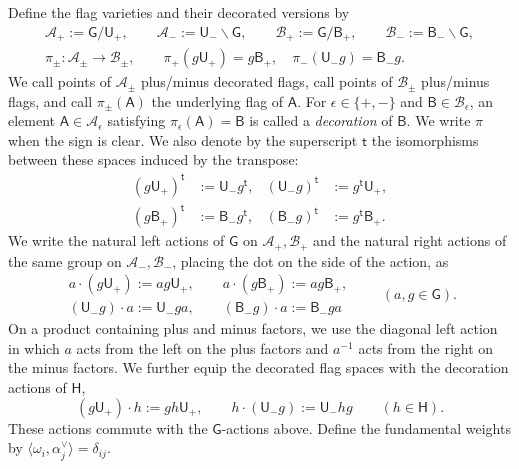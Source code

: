 \documentclass[10pt,a4paper]{article}
\theoremstyle{definition}
\theoremstyle{remark}
\newcommand{\Aplus}{\mathcal A_+}
\newcommand{\Aminus}{\mathcal A_-}
\newcommand{\Bplus}{\mathcal B_+}
\newcommand{\Bminus}{\mathcal B_-}
\newcommand{\flagA}{\mathsf{A}}
\newcommand{\flagB}{\mathsf{B}}
\newcommand{\groupG}{\mathsf{G}}
\newcommand{\borelB}{\mathsf{B}}
\newcommand{\unipotentU}{\mathsf{U}}
\newcommand{\torusH}{\mathsf{H}}
\begin{document}
Define the flag varieties and their decorated versions by
\begin{gather*}
 \Aplus:=\groupG/\unipotentU_+,\qquad
 \Aminus:=\unipotentU_-\backslash\groupG,\qquad
 \Bplus:=\groupG/\borelB_+,\qquad
 \Bminus:=\borelB_-\backslash\groupG,
\\
 \pi_\pm:\mathcal A_\pm\longrightarrow\mathcal B_\pm,\qquad
 \pi_+(g\unipotentU_+)=g\borelB_+,\quad
 \pi_-(\unipotentU_-g)=\borelB_-g.
\end{gather*}
We call points of \(\mathcal A_\pm\) plus/minus decorated flags, call points
of \(\mathcal B_\pm\) plus/minus flags, and call \(\pi_\pm(\flagA)\) the
underlying flag of \(\flagA\).  For \(\epsilon\in\{+,-\}\) and
\(\flagB\in\mathcal B_\epsilon\), an element
\(\flagA\in\mathcal A_\epsilon\) satisfying \(\pi_\epsilon(\flagA)=\flagB\)
is called a \emph{decoration} of \(\flagB\).  We write \(\pi\) when the sign is
clear.  We also denote by the superscript \(\mathsf t\) the isomorphisms
between these spaces induced by the transpose:
\[
 \begin{aligned}
  (g\unipotentU_+)^{\mathsf t}&:=\unipotentU_-g^{\mathsf t},&
  (\unipotentU_-g)^{\mathsf t}&:=g^{\mathsf t}\unipotentU_+,\\
  (g\borelB_+)^{\mathsf t}&:=\borelB_-g^{\mathsf t},&
  (\borelB_-g)^{\mathsf t}&:=g^{\mathsf t}\borelB_+.
 \end{aligned}
\]
We write the natural left actions of \(\groupG\) on
\(\mathcal A_+,\mathcal B_+\) and the natural right actions of the same group on
\(\mathcal A_-,\mathcal B_-\), placing the dot on the side of the action, as
\[
 \begin{gathered}
  a\mathbin{\cdot}(g\unipotentU_+):=ag\unipotentU_+,
  \qquad
  a\mathbin{\cdot}(g\borelB_+):=ag\borelB_+,\\
  (\unipotentU_-g)\mathbin{\cdot}a:=\unipotentU_-ga,
  \qquad
  (\borelB_-g)\mathbin{\cdot}a:=\borelB_-ga
 \end{gathered}
 \qquad(a,g\in\groupG).
\]
On a product containing plus and minus factors, we use the diagonal left
action in which \(a\) acts from the left on the plus factors and \(a^{-1}\)
acts from the right on the minus factors.  We further equip the decorated flag
spaces with the decoration actions of \(\torusH\),
\[
 (g\unipotentU_+)\mathbin{\cdot}h:=gh\unipotentU_+,
 \qquad
 h\mathbin{\cdot}(\unipotentU_-g):=\unipotentU_-hg
 \qquad(h\in\torusH).
\]
These actions commute with the \(\groupG\)-actions above.  Define the
fundamental weights by \(\langle\omega_i,\alpha_j^\vee\rangle=\delta_{ij}\).
\end{document}
